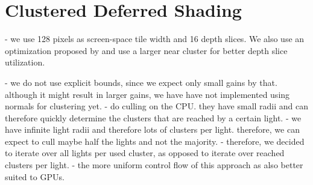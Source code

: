 \section{Clustered Deferred Shading}
\label{sec:impl:clusteredShading}


- we use 128 pixels as screen-space tile width and 16 depth slices. We also use an optimization proposed by \citet{persson::2013::practical} and use a larger near cluster for better depth slice utilization.

- we do not use explicit bounds, since we expect only small gains by that. although it might result in larger gains, we have have not implemented using normals for clustering yet.
- \citet{???practical} do culling on the CPU. they have small radii and can therefore quickly determine the clusters that are reached by a certain light.
- we have infinite light radii and therefore lots of clusters per light. therefore, we can expect to cull maybe half the lights and not the majority.
- therefore, we decided to iterate over all lights per used cluster, as opposed to iterate over reached clusters per light.
- the more uniform control flow of this approach as also better suited to GPUs.


